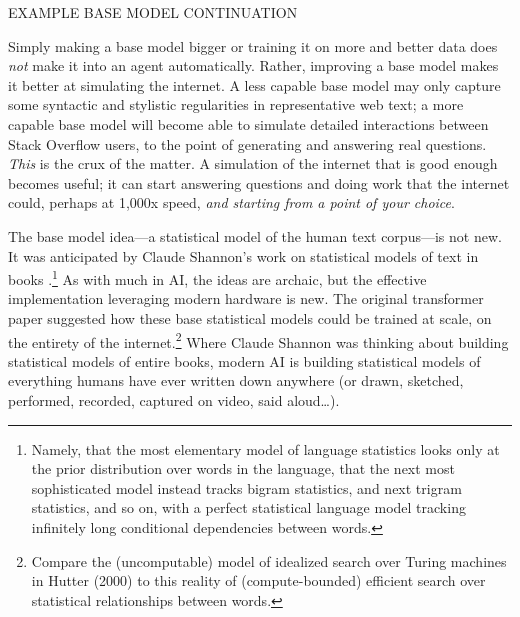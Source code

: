 EXAMPLE BASE MODEL CONTINUATION

Simply making a base model bigger or training it on more and better data does
\emph{not} make it into an agent automatically. Rather, improving a base model
makes it better at simulating the internet. A less capable base model may only
capture some syntactic and stylistic regularities in representative web text; a
more capable base model will become able to simulate detailed interactions
between Stack Overflow users, to the point of generating and answering real
questions. \emph{This} is the crux of the matter. A simulation of the internet
that is good enough becomes useful; it can start answering questions and doing
work that the internet could, perhaps at 1,000x speed, \emph{and starting from
a point of your choice}.

The base model idea---a statistical model of the human text corpus---is not
new. It was anticipated by Claude Shannon's work on statistical models of text
in books \cite{shannon1951english}.\footnote{Namely, that the most elementary
model of language statistics looks only at the prior distribution over words in
the language, that the next most sophisticated model instead tracks bigram
statistics, and next trigram statistics, and so on, with a perfect statistical
language model tracking infinitely long conditional dependencies between
words.} As with much in AI, the ideas are archaic, but the effective
implementation leveraging modern hardware is new. The original transformer
paper suggested how these base statistical models could be trained at scale, on
the entirety of the internet.\footnote{Compare the (uncomputable) model of
idealized search over Turing machines in Hutter (2000) \cite{hutter2000aixi} to
this reality of (compute-bounded) efficient search over statistical
relationships between words.} Where Claude Shannon was thinking about building
statistical models of entire books, modern AI is building statistical models of
everything humans have ever written down anywhere (or drawn, sketched,
performed, recorded, captured on video, said aloud\ldots).

